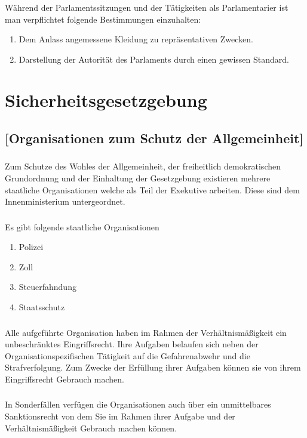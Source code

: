 \documentclass[a4paper, 11pt]{report}
\let\oldsubsection\subsection
\renewcommand{\subsection}{\leftskip=40pt\oldsubsection}
\begin{document}
 
\subsubsection{}
Während der Parlamentssitzungen und der Tätigkeiten als Parlamentarier ist man verpflichtet folgende Bestimmungen einzuhalten: 

\begin{enumerate}
[label=\alph*)]
\vspace{10pt}
\setlength{\leftskip}{60pt}
	\item Dem Anlass angemessene Kleidung zu repräsentativen Zwecken. 
	\item Darstellung der Autorität des Parlaments durch einen gewissen Standard. 
\end{enumerate}
 

\section{Sicherheitsgesetzgebung}

\subsection{[Organisationen zum Schutz der Allgemeinheit]}

\subsubsection{}
Zum Schutze des Wohles der Allgemeinheit, der freiheitlich demokratischen Grundordnung und der Einhaltung der Gesetzgebung existieren mehrere staatliche Organisationen welche als Teil der Exekutive arbeiten. Diese sind dem Innenministerium untergeordnet. 

\subsubsection{}
Es gibt folgende staatliche Organisationen 

\begin{enumerate}[label=\alph*)]
\vspace{10pt}
\setlength{\leftskip}{60pt}
	\item Polizei 
    \item Zoll 
    \item Steuerfahndung 
    \item Staatsschutz 
\end{enumerate}

\subsubsection{}
Alle aufgeführte Organisation haben im Rahmen der Verhältnismäßigkeit ein unbeschränktes Eingriffsrecht. Ihre Aufgaben belaufen sich neben der Organisationspezifischen Tätigkeit auf die Gefahrenabwehr und die Strafverfolgung. Zum Zwecke der Erfüllung ihrer Aufgaben können sie von ihrem Eingriffsrecht Gebrauch machen. 

\subsubsection{}
In Sonderfällen verfügen die Organisationen auch über ein unmittelbares Sanktionsrecht von dem Sie im Rahmen ihrer Aufgabe und der Verhältnismäßigkeit Gebrauch machen können. 
\end{document}
